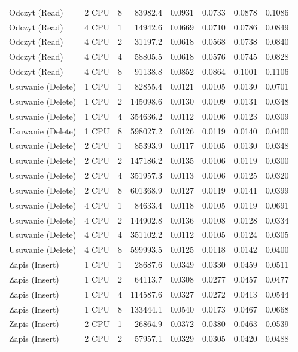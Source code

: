 \begin{table}[ht]
{\begin{tabular}{llcrrrrr}
Odczyt (Read) & 2 CPU & 8 & 83982.4 & 0.0931 & 0.0733 & 0.0878 & 0.1086 \\
Odczyt (Read) & 4 CPU & 1 & 14942.6 & 0.0669 & 0.0710 & 0.0786 & 0.0849 \\
Odczyt (Read) & 4 CPU & 2 & 31197.2 & 0.0618 & 0.0568 & 0.0738 & 0.0840 \\
Odczyt (Read) & 4 CPU & 4 & 58805.5 & 0.0618 & 0.0576 & 0.0745 & 0.0828 \\
Odczyt (Read) & 4 CPU & 8 & 91138.8 & 0.0852 & 0.0864 & 0.1001 & 0.1106 \\
Usuwanie (Delete) & 1 CPU & 1 & 82855.4 & 0.0121 & 0.0105 & 0.0130 & 0.0701 \\
Usuwanie (Delete) & 1 CPU & 2 & 145098.6 & 0.0130 & 0.0109 & 0.0131 & 0.0348 \\
Usuwanie (Delete) & 1 CPU & 4 & 354636.2 & 0.0112 & 0.0106 & 0.0123 & 0.0309 \\
Usuwanie (Delete) & 1 CPU & 8 & 598027.2 & 0.0126 & 0.0119 & 0.0140 & 0.0400 \\
Usuwanie (Delete) & 2 CPU & 1 & 85393.9 & 0.0117 & 0.0105 & 0.0130 & 0.0348 \\
Usuwanie (Delete) & 2 CPU & 2 & 147186.2 & 0.0135 & 0.0106 & 0.0119 & 0.0300 \\
Usuwanie (Delete) & 2 CPU & 4 & 351957.3 & 0.0113 & 0.0106 & 0.0125 & 0.0320 \\
Usuwanie (Delete) & 2 CPU & 8 & 601368.9 & 0.0127 & 0.0119 & 0.0141 & 0.0399 \\
Usuwanie (Delete) & 4 CPU & 1 & 84633.4 & 0.0118 & 0.0105 & 0.0119 & 0.0691 \\
Usuwanie (Delete) & 4 CPU & 2 & 144902.8 & 0.0136 & 0.0108 & 0.0128 & 0.0334 \\
Usuwanie (Delete) & 4 CPU & 4 & 351102.2 & 0.0112 & 0.0105 & 0.0124 & 0.0305 \\
Usuwanie (Delete) & 4 CPU & 8 & 599993.5 & 0.0125 & 0.0118 & 0.0142 & 0.0400 \\
Zapis (Insert) & 1 CPU & 1 & 28687.6 & 0.0349 & 0.0330 & 0.0459 & 0.0511 \\
Zapis (Insert) & 1 CPU & 2 & 64113.7 & 0.0308 & 0.0277 & 0.0457 & 0.0477 \\
Zapis (Insert) & 1 CPU & 4 & 114587.6 & 0.0327 & 0.0272 & 0.0413 & 0.0544 \\
Zapis (Insert) & 1 CPU & 8 & 133444.1 & 0.0540 & 0.0173 & 0.0467 & 0.0668 \\
Zapis (Insert) & 2 CPU & 1 & 26864.9 & 0.0372 & 0.0380 & 0.0463 & 0.0539 \\
Zapis (Insert) & 2 CPU & 2 & 57957.1 & 0.0329 & 0.0305 & 0.0420 & 0.0488 \\

\end{tabular}}
\end{table}
